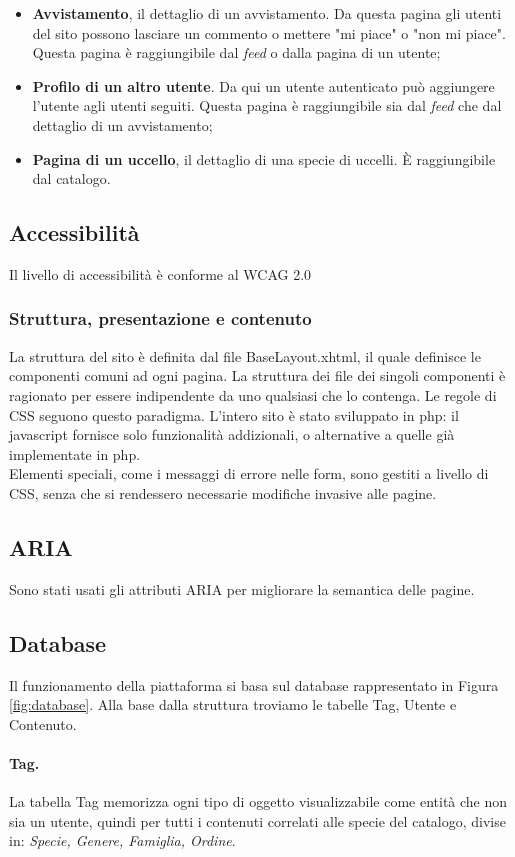 \documentclass[12pt, a4paper]{article}
\begin{document}
    \begin{itemize}
        \item \textbf{Avvistamento}, il dettaglio di un avvistamento. Da questa pagina gli utenti del sito possono lasciare un commento o mettere "mi piace" o "non mi piace". Questa pagina è raggiungibile dal \textit{feed} o dalla pagina di un utente;
        \item \textbf{Profilo di un altro utente}. Da qui un utente autenticato può aggiungere l'utente agli utenti seguiti. Questa pagina è raggiungibile sia dal \textit{feed} che dal dettaglio di un avvistamento;
        \item \textbf{Pagina di un uccello}, il dettaglio di una specie di uccelli. È raggiungibile dal catalogo.
    \end{itemize}

    \subsection{Accessibilità}
    Il livello di accessibilità è conforme al WCAG 2.0
    \subsubsection*{Struttura, presentazione e contenuto}
    La struttura del sito è definita dal file BaseLayout.xhtml, il quale definisce le componenti comuni ad ogni pagina. La struttura dei file dei singoli componenti è ragionato per essere indipendente da uno qualsiasi che lo contenga. Le regole di CSS seguono questo paradigma. L'intero sito è stato sviluppato in php: il javascript fornisce solo funzionalità addizionali, o alternative a quelle già implementate in php. \\
    Elementi speciali, come i messaggi di errore nelle form, sono gestiti a livello di CSS, senza che si rendessero necessarie modifiche invasive alle pagine.
    \subsection*{ARIA}
    Sono stati usati gli attributi ARIA per migliorare la semantica delle pagine.
    \subsection{Database}
    Il funzionamento della piattaforma si basa sul database rappresentato in Figura \ref{fig:database}.
    Alla base dalla struttura troviamo le tabelle Tag, Utente e Contenuto.
    \paragraph{Tag.} La tabella Tag memorizza ogni tipo di oggetto visualizzabile come entità che non sia un utente,
                    quindi per tutti i contenuti correlati alle specie del catalogo, divise in: \emph{Specie, Genere, Famiglia, Ordine}.
\end{document}

